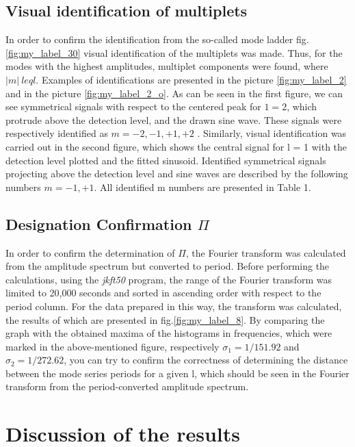 \documentclass{aa}
\begin{document}
\subsection{Visual identification of multiplets}

In order to confirm the identification from the so-called mode ladder fig.\ref{fig:my_label_30} visual identification of the multiplets was made. Thus, for the modes with the highest amplitudes, multiplet components were found, where $ | m | \ leq l. $ Examples of identifications are presented in the picture \ref{fig:my_label_2} and in the picture \ref{fig:my_label_2_o}. As can be seen in the first figure, we can see symmetrical signals with respect to the centered peak for $ 1 = 2$, which protrude above the detection level, and the drawn sine wave. These signals were respectively identified as $ m = -2, -1, +1, + 2$ . Similarly, visual identification was carried out in the second figure, which shows the central signal for l = 1 with the detection level plotted and the fitted sinusoid. Identified symmetrical signals projecting above the detection level and sine waves are described by the following numbers $ m = -1, + 1 $. All identified m numbers are presented in Table 1.

\subsection{Designation Confirmation $\Pi$}

In order to confirm the determination of $ \Pi $, the Fourier transform was calculated from the amplitude spectrum but converted to period. Before performing the calculations, using the \textit{jkft50} program, the range of the Fourier transform was limited to 20,000 seconds and sorted in ascending order with respect to the period column. For the data prepared in this way, the transform was calculated, the results of which are presented in fig.\ref{fig:my_label_8}. By comparing the graph with the obtained maxima of the histograms in frequencies, which were marked in the above-mentioned figure, respectively $ \sigma_1 = 1 / 151.92 $ and $ \sigma_2 = 1 / 272.62 $, you can try to confirm the correctness of determining the distance between the mode series periods for a given l, which should be seen in the Fourier transform from the period-converted amplitude spectrum.

\section{Discussion of the results}
\end{document}
